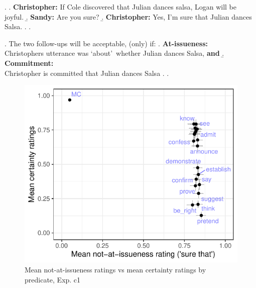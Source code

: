 \documentclass[11pt]{article}
\begin{document}
		\ex. \a. \textbf{Christopher:} If Cole discovered that Julian dances salsa, Logan will be joyful.
			\b. \textbf{Sandy:} Are you sure?
			\b. \textbf{Christopher:} Yes, I'm sure that Julian dances Salsa.
			\z.
		\z.

		\ex. The two follow-ups will be acceptable, (only) if:
			\a. \textbf{At-issueness:}\\ \label{cond:ai}
				Christophers utterance was \lq about\rq\ whether Julian dances Salsa, \textbf{and}
			\b. \textbf{Commitment:}\\ \label{cond:commit}
				Christopher is committed that Julian dances Salsa
			\z.
		\z.

		\begin{figure}[h]
			\centering
			\includegraphics[]{figures/c1-correl.pdf}
			\caption{Mean not-at-issueness ratings vs mean certainty ratings by predicate, Exp. c1}
			\label{fig:c1-corr}
		\end{figure}
\end{document}
